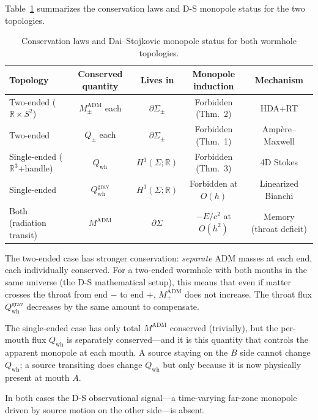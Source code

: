 \documentclass[aps,prd,onecolumn,nofootinbib,superscriptaddress]{revtex4-2}
\begin{document}
Table~\ref{tab:comparison} summarizes the conservation laws and D-S monopole
status for the two topologies.

\begin{table}[t]
\centering
\caption{Conservation laws and Dai--Stojkovic monopole status for both wormhole topologies.}
\label{tab:comparison}
\begin{tabular}{lcccc}
\toprule
Topology & Conserved quantity & Lives in & Monopole induction & Mechanism \\
\midrule
Two-ended ($\mathbb{R}\times S^2$) & $M_\pm^{\mathrm{ADM}}$ each & $\partial\Sigma_\pm$ & Forbidden (Thm.~2) & HDA+RT \\
Two-ended & $Q_\pm$ each & $\partial\Sigma_\pm$ & Forbidden (Thm.~1) & Amp\`ere--Maxwell \\
Single-ended ($\mathbb{R}^3$+handle) & $Q_{\mathrm{wh}}$ & $H^1(\Sigma;\mathbb{R})$ & Forbidden (Thm.~3) & 4D Stokes \\
Single-ended & $Q_{\mathrm{wh}}^{\mathrm{grav}}$ & $H^1(\Sigma;\mathbb{R})$ & Forbidden at $O(h)$ & Linearized Bianchi \\
Both (radiation transit) & $M^{\mathrm{ADM}}$ & $\partial\Sigma$ & $-E/c^2$ at $O(h^2)$ & Memory (throat deficit) \\
\bottomrule
\end{tabular}
\end{table}

The two-ended case has stronger conservation: \emph{separate} ADM masses at
each end, each individually conserved.  For a two-ended wormhole with both
mouths in the same universe (the D-S mathematical setup), this means that even
if matter crosses the throat from end $-$ to end $+$, $M_+^{\mathrm{ADM}}$
does not increase.  The throat flux $Q_{\mathrm{wh}}^{\mathrm{grav}}$ decreases
by the same amount to compensate.

The single-ended case has only total $M^{\mathrm{ADM}}$ conserved (trivially),
but the per-mouth flux $Q_{\mathrm{wh}}$ is separately conserved---and it is
this quantity that controls the apparent monopole at each mouth.  A source
staying on the $B$ side cannot change $Q_{\mathrm{wh}}$; a source transiting
does change $Q_{\mathrm{wh}}$ but only because it is now physically present at
mouth $A$.

In both cases the D-S observational signal---a time-varying far-zone monopole
driven by source motion on the other side---is absent.

\end{document}
